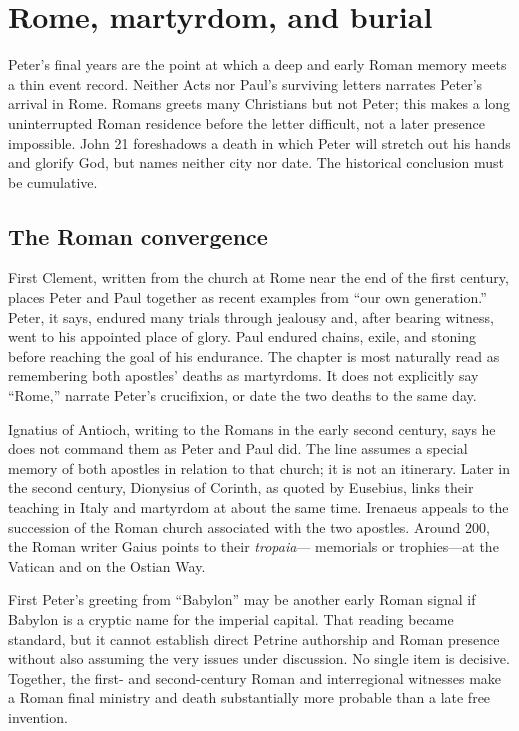 \section{Rome, martyrdom, and burial}\label{sec:peter-rome}

Peter's final years are the point at which a deep and early Roman memory meets
a thin event record. Neither Acts nor Paul's surviving letters narrates
Peter's arrival in Rome. Romans greets many Christians but not Peter; this
makes a long uninterrupted Roman residence before the letter difficult, not a
later presence impossible. John 21 foreshadows a death in which Peter will
stretch out his hands and glorify God, but names neither city nor date. The
historical conclusion must be cumulative.

\subsection{The Roman convergence}

First Clement, written from the church at Rome near the end of the first
century, places Peter and Paul together as recent examples from ``our own
generation.'' Peter, it says, endured many trials through jealousy and, after
bearing witness, went to his appointed place of glory. Paul endured chains,
exile, and stoning before reaching the goal of his endurance. The chapter is
most naturally read as remembering both apostles' deaths as martyrdoms. It
does not explicitly say ``Rome,'' narrate Peter's crucifixion, or date the two
deaths to the same day.

Ignatius of Antioch, writing to the Romans in the early second century, says
he does not command them as Peter and Paul did. The line assumes a special
memory of both apostles in relation to that church; it is not an itinerary.
Later in the second century, Dionysius of Corinth, as quoted by Eusebius,
links their teaching in Italy and martyrdom at about the same time. Irenaeus
appeals to the succession of the Roman church associated with the two
apostles. Around 200, the Roman writer Gaius points to their \emph{tropaia}---
memorials or trophies---at the Vatican and on the Ostian Way.

First Peter's greeting from ``Babylon'' may be another early Roman signal if
Babylon is a cryptic name for the imperial capital. That reading became
standard, but it cannot establish direct Petrine authorship and Roman presence
without also assuming the very issues under discussion. No single item is
decisive. Together, the first- and second-century Roman and interregional
witnesses make a Roman final ministry and death substantially more probable
than a late free invention.

